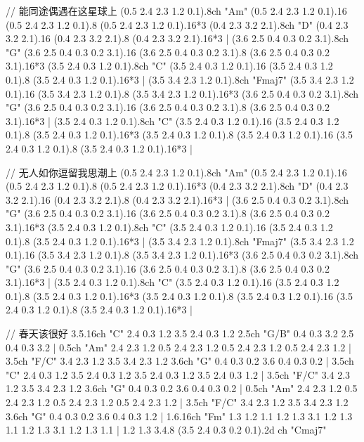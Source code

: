 // 能同途偶遇在这星球上
(0.5 2.4 2.3 1.2 0.1).8{ch "Am"}
(0.5 2.4 2.3 1.2 0.1).16
(0.5 2.4 2.3 1.2 0.1).8
(0.5 2.4 2.3 1.2 0.1).16*3
(0.4 2.3 3.2 2.1).8{ch "D"}
(0.4 2.3 3.2 2.1).16
(0.4 2.3 3.2 2.1).8
(0.4 2.3 3.2 2.1).16*3 |
(3.6 2.5 0.4 0.3 0.2 3.1).8{ch "G"}
(3.6 2.5 0.4 0.3 0.2 3.1).16
(3.6 2.5 0.4 0.3 0.2 3.1).8
(3.6 2.5 0.4 0.3 0.2 3.1).16*3
(3.5 2.4 0.3 1.2 0.1).8{ch "C"}
(3.5 2.4 0.3 1.2 0.1).16
(3.5 2.4 0.3 1.2 0.1).8
(3.5 2.4 0.3 1.2 0.1).16*3 |
(3.5 3.4 2.3 1.2 0.1).8{ch "Fmaj7"}
(3.5 3.4 2.3 1.2 0.1).16
(3.5 3.4 2.3 1.2 0.1).8
(3.5 3.4 2.3 1.2 0.1).16*3
(3.6 2.5 0.4 0.3 0.2 3.1).8{ch "G"}
(3.6 2.5 0.4 0.3 0.2 3.1).16
(3.6 2.5 0.4 0.3 0.2 3.1).8
(3.6 2.5 0.4 0.3 0.2 3.1).16*3 |
(3.5 2.4 0.3 1.2 0.1).8{ch "C"}
(3.5 2.4 0.3 1.2 0.1).16
(3.5 2.4 0.3 1.2 0.1).8
(3.5 2.4 0.3 1.2 0.1).16*3
(3.5 2.4 0.3 1.2 0.1).8
(3.5 2.4 0.3 1.2 0.1).16
(3.5 2.4 0.3 1.2 0.1).8
(3.5 2.4 0.3 1.2 0.1).16*3 |

// 无人如你逗留我思潮上
(0.5 2.4 2.3 1.2 0.1).8{ch "Am"}
(0.5 2.4 2.3 1.2 0.1).16
(0.5 2.4 2.3 1.2 0.1).8
(0.5 2.4 2.3 1.2 0.1).16*3
(0.4 2.3 3.2 2.1).8{ch "D"}
(0.4 2.3 3.2 2.1).16
(0.4 2.3 3.2 2.1).8
(0.4 2.3 3.2 2.1).16*3 |
(3.6 2.5 0.4 0.3 0.2 3.1).8{ch "G"}
(3.6 2.5 0.4 0.3 0.2 3.1).16
(3.6 2.5 0.4 0.3 0.2 3.1).8
(3.6 2.5 0.4 0.3 0.2 3.1).16*3
(3.5 2.4 0.3 1.2 0.1).8{ch "C"}
(3.5 2.4 0.3 1.2 0.1).16
(3.5 2.4 0.3 1.2 0.1).8
(3.5 2.4 0.3 1.2 0.1).16*3 |
(3.5 3.4 2.3 1.2 0.1).8{ch "Fmaj7"}
(3.5 3.4 2.3 1.2 0.1).16
(3.5 3.4 2.3 1.2 0.1).8
(3.5 3.4 2.3 1.2 0.1).16*3
(3.6 2.5 0.4 0.3 0.2 3.1).8{ch "G"}
(3.6 2.5 0.4 0.3 0.2 3.1).16
(3.6 2.5 0.4 0.3 0.2 3.1).8
(3.6 2.5 0.4 0.3 0.2 3.1).16*3 |
(3.5 2.4 0.3 1.2 0.1).8{ch "C"}
(3.5 2.4 0.3 1.2 0.1).16
(3.5 2.4 0.3 1.2 0.1).8
(3.5 2.4 0.3 1.2 0.1).16*3
(3.5 2.4 0.3 1.2 0.1).8
(3.5 2.4 0.3 1.2 0.1).16
(3.5 2.4 0.3 1.2 0.1).8
(3.5 2.4 0.3 1.2 0.1).16*3 |

// 春天该很好
3.5.16{ch "C"} 2.4 0.3 1.2 3.5 2.4 0.3 1.2
2.5{ch "G/B"} 0.4 0.3 3.2 2.5 0.4 0.3 3.2 |
0.5{ch "Am"} 2.4 2.3 1.2 0.5 2.4 2.3 1.2
0.5 2.4 2.3 1.2 0.5 2.4 2.3 1.2 |
3.5{ch "F/C"} 3.4 2.3 1.2 3.5 3.4 2.3 1.2
3.6{ch "G"} 0.4 0.3 0.2 3.6 0.4 0.3 0.2 |
3.5{ch "C"} 2.4 0.3 1.2 3.5 2.4 0.3 1.2
3.5 2.4 0.3 1.2 3.5 2.4 0.3 1.2 |
3.5{ch "F/C"} 3.4 2.3 1.2 3.5 3.4 2.3 1.2
3.6{ch "G"} 0.4 0.3 0.2 3.6 0.4 0.3 0.2 |
0.5{ch "Am"} 2.4 2.3 1.2 0.5 2.4 2.3 1.2
0.5 2.4 2.3 1.2 0.5 2.4 2.3 1.2 |
3.5{ch "F/C"} 3.4 2.3 1.2 3.5 3.4 2.3 1.2
3.6{ch "G"} 0.4 0.3 0.2 3.6 0.4 0.3 1.2 |
1.6.16{ch "Fm"} 1.3 1.2 1.1 1.2 1.3 3.1 1.2
1.3 1.1 1.2 1.3 3.1 1.2 1.3 1.1 |
1.2 1.3 3.4.8 (3.5 2.4 0.3 0.2 0.1).2{d ch "Cmaj7"}
